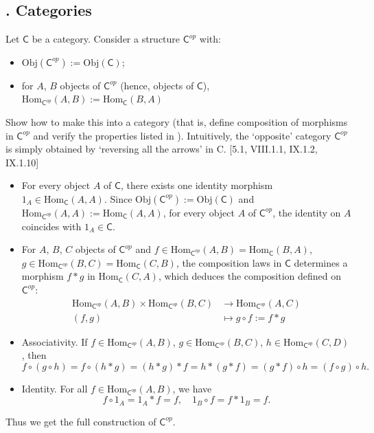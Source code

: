 \documentclass[12pt,letterpaper,boxed]{hmcpset}
\newcommand{\Obj}{\mathrm{Obj}}
\newcommand{\Hom}{\mathrm{Hom}}
\begin{document}
\subsection{. Categories}
\hypertarget{Exercise I.3.1}{}
\begin{problem}[3.1]
	Let $\mathsf{C}$ be a category. Consider a structure $\mathsf{C}^{op}$ with:
	\begin{itemize}
	\item $\Obj(\mathsf{C}^{op}) := \Obj(\mathsf{C})$;
	\item for $A$, $B$ objects of $\mathsf{C}^{op}$ (hence, objects of $\mathsf{C}$), $\Hom_{\mathsf{C}^{op}} (A,B) := \Hom_\mathsf{C}(B,A)$
	\end{itemize}
	Show how to make this into a category (that is, define composition of morphisms
	in $\mathsf{C}^{op}$ and verify the properties listed in ).
	Intuitively, the `opposite' category $\mathsf{C}^{op}$ is simply obtained by `reversing all the
	arrows' in C. [5.1, \textsection VIII.1.1, \textsection IX.1.2, IX.1.10]
\end{problem}
\begin{solution}
	\begin{itemize}
		\item For every object $A$ of $\mathsf{C}$, there exists one identity morphism $1_A\in\Hom_\mathsf{C}(A,A)$. Since $\Obj(\mathsf{C}^{op}) := \Obj(\mathsf{C})$ and $\Hom_{\mathsf{C}^{op}} (A,A) := \Hom_\mathsf{C}(A,A)$, for every object $A$ of $\mathsf{C}^{op}$, the identity on $A$ coincides with $1_A\in\mathsf{C}$. 
		\item For $A$, $B$, $C$ objects of $\mathsf{C}^{op}$ and $f\in\Hom_{\mathsf{C}^{op}} (A,B)=\Hom_\mathsf{C}(B,A)$, $g\in\Hom_{\mathsf{C}^{op}} (B,C)=\Hom_\mathsf{C}(C,B)$, the composition laws in $\mathsf{C}$ determines a morphism $f*g$ in $\Hom_{\mathsf{C}} (C,A)$, which deduces the composition defined on $\mathsf{C}^{op}$:
		\[
		\begin{aligned}
		\Hom_{\mathsf{C}^{op}} (A,B)\times\Hom_{\mathsf{C}^{op}} (B,C)&\longrightarrow \Hom_{\mathsf{C}^{op}} (A,C)\\
		(f,g)&\longmapsto g\circ f:=f*g
		\end{aligned}
		\]
		\item Associativity. If $f\in\Hom_{\mathsf{C}^{op}} (A,B)$, $g\in\Hom_{\mathsf{C}^{op}} (B,C)$, $h\in\Hom_{\mathsf{C}^{op}} (C,D)$, then
		\[
		f\circ(g\circ h)=f\circ(h*g)=(h*g)*f=h*(g*f)=(g*f)\circ h=(f\circ g)\circ h.
		\]
		\item Identity. For all $f\in\Hom_{\mathsf{C}^{op}} (A,B)$, we have
		\[
		f\circ 1_A=1_A*f=f,\quad 1_B\circ f=f*1_B=f.
		\]
	\end{itemize}
	Thus we get the full construction of $\mathsf{C}^{op}$.
\end{solution}
\end{document}
